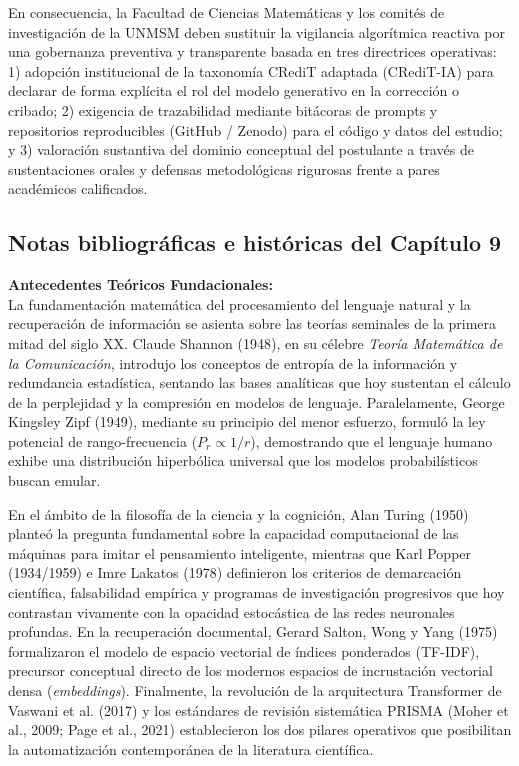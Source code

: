 En consecuencia, la Facultad de Ciencias Matemáticas y los comités de investigación de la UNMSM deben sustituir la vigilancia algorítmica reactiva por una gobernanza preventiva y transparente basada en tres directrices operativas: 1) adopción institucional de la taxonomía CRediT adaptada (CRediT-IA) para declarar de forma explícita el rol del modelo generativo en la corrección o cribado; 2) exigencia de trazabilidad mediante bitácoras de prompts y repositorios reproducibles (GitHub / Zenodo) para el código y datos del estudio; y 3) valoración sustantiva del dominio conceptual del postulante a través de sustentaciones orales y defensas metodológicas rigurosas frente a pares académicos calificados.

\newpage
{}
\subsection*{Notas bibliográficas e históricas del Capítulo 9}

\textbf{Antecedentes Teóricos Fundacionales:}\\[0.2cm]
La fundamentación matemática del procesamiento del lenguaje natural y la recuperación de información se asienta sobre las teorías seminales de la primera mitad del siglo XX. Claude Shannon (1948), en su célebre \textit{Teoría Matemática de la Comunicación}, introdujo los conceptos de entropía de la información y redundancia estadística, sentando las bases analíticas que hoy sustentan el cálculo de la perplejidad y la compresión en modelos de lenguaje. Paralelamente, George Kingsley Zipf (1949), mediante su principio del menor esfuerzo, formuló la ley potencial de rango-frecuencia ($P_r \propto 1/r$), demostrando que el lenguaje humano exhibe una distribución hiperbólica universal que los modelos probabilísticos buscan emular. 

En el ámbito de la filosofía de la ciencia y la cognición, Alan Turing (1950) planteó la pregunta fundamental sobre la capacidad computacional de las máquinas para imitar el pensamiento inteligente, mientras que Karl Popper (1934/1959) e Imre Lakatos (1978) definieron los criterios de demarcación científica, falsabilidad empírica y programas de investigación progresivos que hoy contrastan vivamente con la opacidad estocástica de las redes neuronales profundas. En la recuperación documental, Gerard Salton, Wong y Yang (1975) formalizaron el modelo de espacio vectorial de índices ponderados (TF-IDF), precursor conceptual directo de los modernos espacios de incrustación vectorial densa (\textit{embeddings}). Finalmente, la revolución de la arquitectura Transformer de Vaswani et al. (2017) y los estándares de revisión sistemática PRISMA (Moher et al., 2009; Page et al., 2021) establecieron los dos pilares operativos que posibilitan la automatización contemporánea de la literatura científica.\\[0.4cm]

